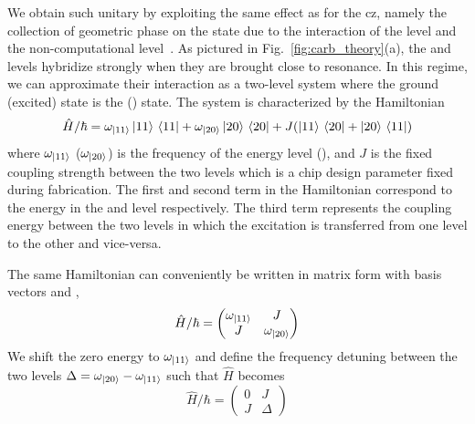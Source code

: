 We obtain such unitary by exploiting the same effect as for the \gls{cz}, namely the collection of geometric phase on the \oo{} state due to the interaction of the \oo{} level and the non-computational \tz{} level~\cite{Strauch2003QuantumQubits, DiCarlo2009DemonstrationProcessor}. As pictured in Fig.~\ref{fig:carb_theory}(a),  the \oo{} and \tz{} levels hybridize strongly when they are brought close to resonance. In this regime, we can approximate their interaction as a two-level system where the ground (excited) state is the \oo{} (\tz{}) state. The system is characterized by the Hamiltonian
\begin{equation}
    \hat H/\hbar= \omega_{\ket{11}} \ket{11}{} \bra{11} + \omega_{\ket{20}} \ket{20}{} \bra{20} + J( \ket{11}{}\bra{20}+ \ket{20}{}\bra{11})
\end{equation}
where  $\omega_{\ket{11}}$ ($\omega_{\ket{20}}$) is the frequency of the energy level \oo{} (\tz{}), and $J$ is the fixed coupling strength between the two levels which is a chip design parameter fixed during fabrication. The first and second term in the Hamiltonian correspond to the energy in the \oo{} and \tz{} level respectively. The third term represents the coupling energy between the two levels in which the excitation is transferred from one level to the other and vice-versa. 

The same Hamiltonian can conveniently be written in matrix form with basis vectors \oo{} and \tz{},
\begin{equation}
\hat{H}/\hbar=
\begin{pmatrix}
\omega_{\ket{11}} & J \\
J & \omega_{\ket{20}}
\end{pmatrix}
\end{equation}
We shift the zero energy to $\omega_{\ket{11}}$  and define the frequency detuning between the two levels $\Delta = \omega_{\ket{20}}- \omega_{\ket{11}}$ such that $\hat H$ becomes
\begin{equation}
\hat{H}/\hbar=
\begin{pmatrix}
0 & J \\
J & \Delta
\end{pmatrix}
\end{equation}

